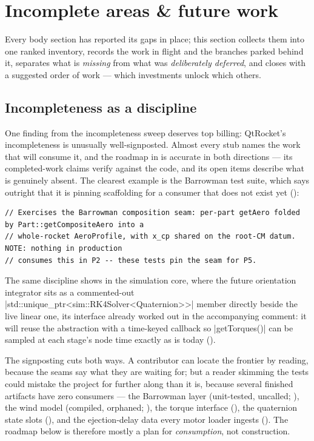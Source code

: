 \section{Incomplete areas \& future work}\label{sec:roadmap}

Every body section has reported its gaps in place; this section collects them into one ranked
inventory, records the work in flight and the branches parked behind it, separates what is
\emph{missing} from what was \emph{deliberately deferred}, and closes with a suggested order of
work --- which investments unlock which others.

\subsection{Incompleteness as a discipline}\label{sec:roadmap-signposting}

One finding from the incompleteness sweep deserves top billing: QtRocket's incompleteness is
unusually well-signposted. Almost every stub names the work that will consume it, and the roadmap
in  is accurate in both directions --- its completed-work claims verify against the
code, and its open items describe what is genuinely absent. The clearest example is the Barrowman
test suite, which says outright that it is pinning scaffolding for a consumer that does not exist
yet ():

\begin{verbatim}
// Exercises the Barrowman composition seam: per-part getAero folded by Part::getCompositeAero into a
// whole-rocket AeroProfile, with x_cp shared on the root-CM datum. NOTE: nothing in production
// consumes this in P2 -- these tests pin the seam for P5.
\end{verbatim}

\noindent The same discipline shows in the simulation core, where the future orientation
integrator sits as a commented-out \cppinline|std::unique_ptr<sim::RK4Solver<Quaternion>>| member
directly beside the live linear one, its interface already worked out in the accompanying comment:
it will reuse the  abstraction with a time-keyed callback so
\cppinline|getTorques()| can be sampled at each stage's node time exactly as  is
today ().

\begin{keyinsight}
The signposting cuts both ways. A contributor can locate the frontier by reading, because the
seams say what they are waiting for; but a reader skimming the tests could mistake the project for
further along than it is, because several finished artifacts have zero consumers --- the Barrowman
layer (unit-tested, uncalled; ), the wind model (compiled,
orphaned; ), the torque interface (),
the quaternion state slots (), and the ejection-delay data every motor
loader ingests (). The roadmap below is therefore mostly a
plan for \emph{consumption}, not construction.
\end{keyinsight}

